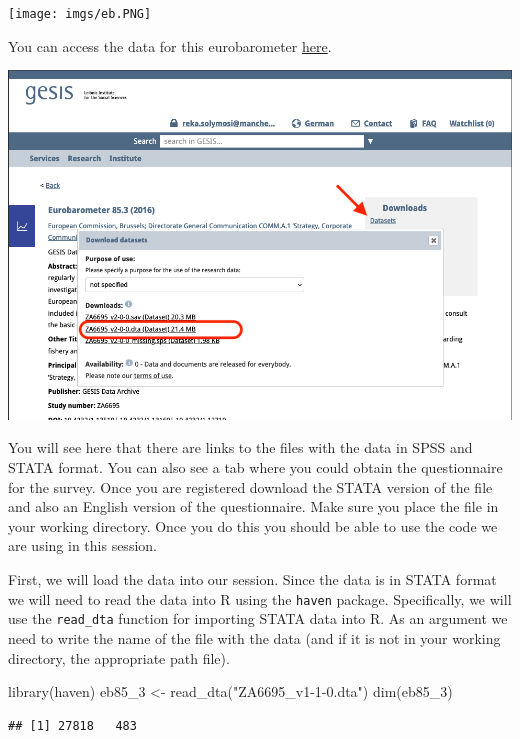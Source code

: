 \documentclass[
]{book}
\newenvironment{Shaded}{\begin{snugshade}}{\end{snugshade}}
\newcommand{\FunctionTok}[1]{\textcolor[rgb]{0.00,0.00,0.00}{#1}}
\newcommand{\NormalTok}[1]{#1}
\newcommand{\OtherTok}[1]{\textcolor[rgb]{0.56,0.35,0.01}{#1}}
\newcommand{\StringTok}[1]{\textcolor[rgb]{0.31,0.60,0.02}{#1}}
\begin{document}
\texttt{[image: imgs/eb.PNG]}

You can access the data for this eurobarometer \href{https://dbk.gesis.org/dbksearch/sdesc2.asp?no=6695\&db=e\&doi=10.4232/1.13169}{here}.

\includegraphics{imgs/gesis.PNG}

You will see here that there are links to the files with the data in SPSS and STATA format. You can also see a tab where you could obtain the questionnaire for the survey. Once you are registered download the STATA version of the file and also an English version of the questionnaire. Make sure you place the file in your working directory. Once you do this you should be able to use the code we are using in this session.

First, we will load the data into our session. Since the data is in STATA format we will need to read the data into R using the \texttt{haven} package. Specifically, we will use the \texttt{read\_dta} function for importing STATA data into R. As an argument we need to write the name of the file with the data (and if it is not in your working directory, the appropriate path file).

\begin{Shaded}
\begin{Highlighting}[]
\FunctionTok{library}\NormalTok{(haven)}
\NormalTok{eb85\_3 }\OtherTok{\textless{}{-}} \FunctionTok{read\_dta}\NormalTok{(}\StringTok{"ZA6695\_v1{-}1{-}0.dta"}\NormalTok{)}
\FunctionTok{dim}\NormalTok{(eb85\_3)}
\end{Highlighting}
\end{Shaded}

\begin{verbatim}
## [1] 27818   483
\end{verbatim}
\end{document}
